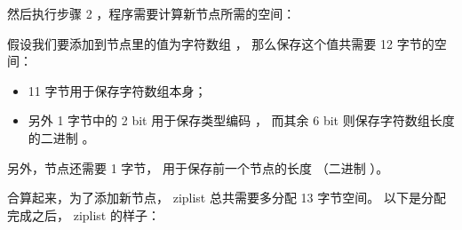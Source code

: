 \documentclass[a4paper,11pt,english]{sphinxmanual}
\begin{document}
然后执行步骤 2 ，程序需要计算新节点所需的空间：

假设我们要添加到节点里的值为字符数组  ，
那么保存这个值共需要 12 字节的空间：
\begin{itemize}
\item {} 
11 字节用于保存字符数组本身；

\item {} 
另外 1 字节中的 2 bit 用于保存类型编码  ， 而其余 6 bit 则保存字符数组长度  的二进制  。

\end{itemize}

另外，节点还需要 1 字节，
用于保存前一个节点的长度  （二进制  ）。

合算起来，为了添加新节点， ziplist 总共需要多分配 13 字节空间。
以下是分配完成之后，
ziplist 的样子：
\end{document}
